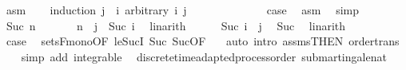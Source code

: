 \begin{isabellebody}
\ asm\isanewline
\ \ \isamarkupfalse%
\ {\isacharparenleft}{\kern0pt}induction\ {\isachardoublequoteopen}j\ {\isacharminus}{\kern0pt}\ i{\isachardoublequoteclose}\ arbitrary{\isacharcolon}{\kern0pt}\ i\ j{\isacharparenright}{\kern0pt}\isanewline
\ \ \ \ \isamarkupfalse%
\ {}\isanewline
\ \ \ \ \isamarkupfalse%
\ \isamarkupfalse%
\ {\isacharquery}{\kern0pt}case\ \isamarkupfalse%
\ asm\ \isamarkupfalse%
\ simp\isanewline
\ \ \isamarkupfalse%
\isanewline
\ \ \ \ \isamarkupfalse%
\ {\isacharparenleft}{\kern0pt}Suc\ n{\isacharparenright}{\kern0pt}\isanewline
\ \ \ \ \isamarkupfalse%
\ {\isacharasterisk}{\kern0pt}{\isacharcolon}{\kern0pt}\ {\isachardoublequoteopen}n\ {\isacharequal}{\kern0pt}\ j\ {\isacharminus}{\kern0pt}\ Suc\ i{\isachardoublequoteclose}\ \isamarkupfalse%
\ linarith\isanewline
\ \ \ \ \isamarkupfalse%
\ {\isachardoublequoteopen}Suc\ i\ {\isasymle}\ j{\isachardoublequoteclose}\ \isamarkupfalse%
\ Suc{\isacharparenleft}{\kern0pt}{}{\isacharcomma}{\kern0pt}{}{\isacharparenright}{\kern0pt}\ \isamarkupfalse%
\ linarith\isanewline
\ \ \ \ \isamarkupfalse%
\ {\isacharquery}{\kern0pt}case\ \isamarkupfalse%
\ sets{\isacharunderscore}{\kern0pt}F{\isacharunderscore}{\kern0pt}mono{\isacharbrackleft}{\kern0pt}OF\ le{\isacharunderscore}{\kern0pt}SucI{\isacharbrackright}{\kern0pt}\ Suc{\isacharparenleft}{\kern0pt}{}{\isacharparenright}{\kern0pt}\ Suc{\isacharparenleft}{\kern0pt}{}{\isacharparenright}{\kern0pt}{\isacharbrackleft}{\kern0pt}OF\ {\isacharasterisk}{\kern0pt}{\isacharbrackright}{\kern0pt}\ \isamarkupfalse%
\ {\isacharparenleft}{\kern0pt}auto\ intro{\isacharcolon}{\kern0pt}\ assms{\isacharparenleft}{\kern0pt}{}{\isacharparenright}{\kern0pt}{\isacharbrackleft}{\kern0pt}THEN\ order{\isacharunderscore}{\kern0pt}trans{\isacharbrackright}{\kern0pt}{\isacharparenright}{\kern0pt}\isanewline
\ \ \isamarkupfalse%
\isanewline
{}\isamarkupfalse%
\ {\isacharparenleft}{\kern0pt}simp\ add{\isacharcolon}{\kern0pt}\ integrable{\isacharparenright}{\kern0pt}%
\endisatagproof
{\isafoldproof}%
%
\isadelimproof
\isanewline
%
\endisadelimproof
\isanewline
{}\isamarkupfalse%
\ {\isacharparenleft}{\kern0pt}\ discrete{\isacharunderscore}{\kern0pt}time{\isacharunderscore}{\kern0pt}adapted{\isacharunderscore}{\kern0pt}process{\isacharunderscore}{\kern0pt}order{\isacharparenright}{\kern0pt}\ submartingale{\isacharunderscore}{\kern0pt}nat{\isacharcolon}{\kern0pt}\isanewline

\end{isabellebody}
